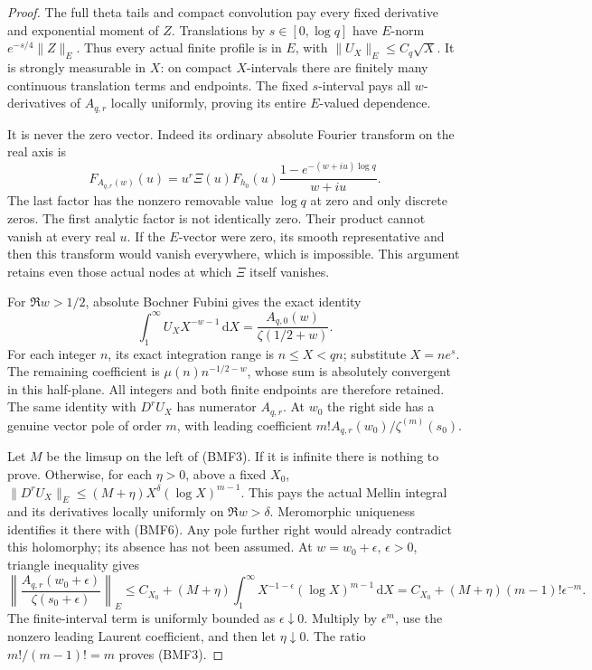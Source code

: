 \documentclass[11pt]{article}
\theoremstyle{remark}\newtheorem{remark}[theorem]{Remark}
\newcommand{\dd}{\,\mathrm d}
\begin{document}
\begin{proof}
The full theta tails and compact convolution pay every fixed
derivative and exponential moment of \(Z\).
Translations by \(s\in[0,\log q]\) have \(E\)-norm
\(e^{-s/4}\|Z\|_E\). Thus every actual finite profile
is in \(E\), with \(\|U_X\|_E\le C_q\sqrt X\).
It is strongly measurable in \(X\): on compact \(X\)-intervals
there are finitely many continuous translation terms and endpoints.
The fixed \(s\)-interval pays all \(w\)-derivatives of \(A_{q,r}\)
locally uniformly, proving its entire \(E\)-valued dependence.

It is never the zero vector. Indeed its ordinary absolute
Fourier transform on the real axis is
\[
 F_{A_{q,r}(w)}(u)
  =u^r\Xi(u)F_{h_0}(u)
                \frac{1-e^{-(w+iu)\log q}}{w+iu}.             \tag{BMF5}
\]
The last factor has the nonzero removable value \(\log q\)
at zero and only discrete zeros. The first analytic factor
is not identically zero. Their product cannot vanish at every
real \(u\). If the \(E\)-vector were zero, its smooth
representative and then this transform would vanish everywhere,
which is impossible. This argument retains even those actual
nodes at which \(\Xi\) itself vanishes.

For \(\Re w>1/2\), absolute Bochner Fubini gives the exact identity
\[
 \int_1^\infty U_X X^{-w-1}\dd X
                       =\frac{A_{q,0}(w)}{\zeta(1/2+w)}.      \tag{BMF6}
\]
For each integer \(n\), its exact integration range is
\(n\le X<qn\); substitute \(X=ne^s\).
The remaining coefficient is \(\mu(n)n^{-1/2-w}\),
whose sum is absolutely convergent in this half-plane.
All integers and both finite endpoints are therefore retained.
The same identity with \(D^rU_X\) has numerator \(A_{q,r}\).
At \(w_0\) the right side has a genuine vector pole of order \(m\),
with leading coefficient \(m!A_{q,r}(w_0)/\zeta^{(m)}(s_0)\).

Let \(M\) be the limsup on the left of (BMF3).
If it is infinite there is nothing to prove.
Otherwise, for each \(\eta>0\), above a fixed \(X_0\),
\(\|D^rU_X\|_E\le(M+\eta)X^\delta(\log X)^{m-1}\).
This pays the actual Mellin integral and its derivatives
locally uniformly on \(\Re w>\delta\).
Meromorphic uniqueness identifies it there with (BMF6).
Any pole further right would already contradict this holomorphy;
its absence has not been assumed.
At \(w=w_0+\epsilon\), \(\epsilon>0\), triangle inequality gives
\[
 \left\|\frac{A_{q,r}(w_0+\epsilon)}
                   {\zeta(s_0+\epsilon)}\right\|_E
 \le C_{X_0}+(M+\eta)\int_1^\infty
                 X^{-1-\epsilon}(\log X)^{m-1}\dd X
 =C_{X_0}+(M+\eta)(m-1)!\epsilon^{-m}.                       \tag{BMF7}
\]
The finite-interval term is uniformly bounded as
\(\epsilon\downarrow0\). Multiply by \(\epsilon^m\), use the
nonzero leading Laurent coefficient, and then let
\(\eta\downarrow0\). The ratio \(m!/(m-1)!=m\) proves (BMF3).


\end{proof}
\end{document}
